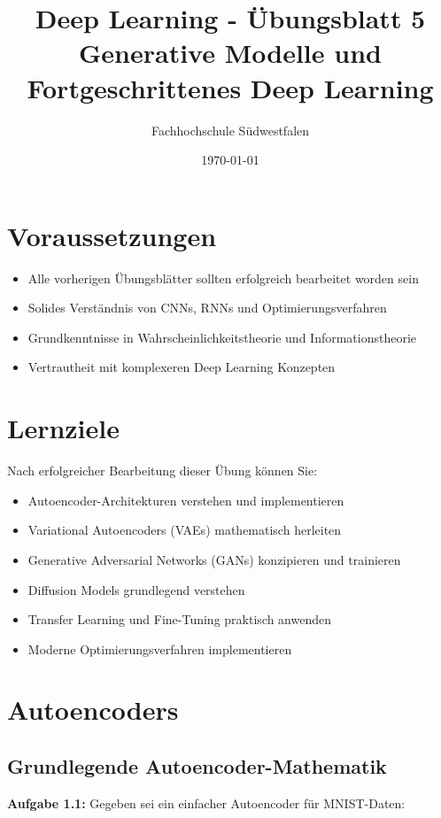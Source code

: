 \documentclass[12pt,a4paper]{article}
\title{\textbf{Deep Learning - Übungsblatt 5} \\ \large Generative Modelle und Fortgeschrittenes Deep Learning}
\author{Fachhochschule Südwestfalen}
\date{\today}
\begin{document}
\maketitle

\section*{Voraussetzungen}
\begin{itemize}
    \item Alle vorherigen Übungsblätter sollten erfolgreich bearbeitet worden sein
    \item Solides Verständnis von CNNs, RNNs und Optimierungsverfahren
    \item Grundkenntnisse in Wahrscheinlichkeitstheorie und Informationstheorie
    \item Vertrautheit mit komplexeren Deep Learning Konzepten
\end{itemize}

\section*{Lernziele}
Nach erfolgreicher Bearbeitung dieser Übung können Sie:
\begin{itemize}
    \item Autoencoder-Architekturen verstehen und implementieren
    \item Variational Autoencoders (VAEs) mathematisch herleiten
    \item Generative Adversarial Networks (GANs) konzipieren und trainieren
    \item Diffusion Models grundlegend verstehen
    \item Transfer Learning und Fine-Tuning praktisch anwenden
    \item Moderne Optimierungsverfahren implementieren
\end{itemize}

\section{Autoencoders}

\subsection{Grundlegende Autoencoder-Mathematik}

\textbf{Aufgabe 1.1:} Gegeben sei ein einfacher Autoencoder für MNIST-Daten:
\end{document}
